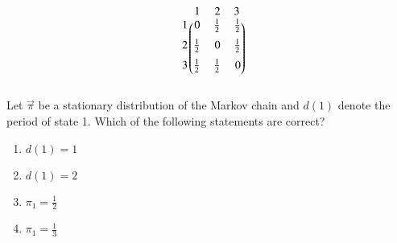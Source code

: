 \begin{enumerate}[label=\thesection.\arabic*.,ref=\thesection.\theenumi]
\begin{align}
\begin{blockarray}{c@{\hspace{1pt}}rrr@{\hspace{3pt}}}
            & 1   & 2 & 3 \\
        \begin{block}{r@{\hspace{3pt}}@{\hspace{1pt}}
    (@{\hspace{1pt}}rrr@{\hspace{1pt}}@{\hspace{1pt}})}
        1 &  0 & \frac{1}{2} & \frac{1}{2}   \\ [2mm]
        2 & \frac{1}{2}  & 0 & \frac{1}{2}\\ [2mm]
        3 & \frac{1}{2}  &  \frac{1}{2} & 0  \\ [2mm]
%
        \end{block}
    \end{blockarray}
\end{align}
%
Let $\vec{\pi}$ be a stationary distribution of the Markov chain and $d(1)$ denote the
period of state 1.  Which of the following statements are correct?
\begin{enumerate}
\item $d(1) = 1$
\item $d(1) = 2$
\item $\pi_1 = \frac{1}{2}$
\item $\pi_1 = \frac{1}{3}$
\end{enumerate}
\end{enumerate}
